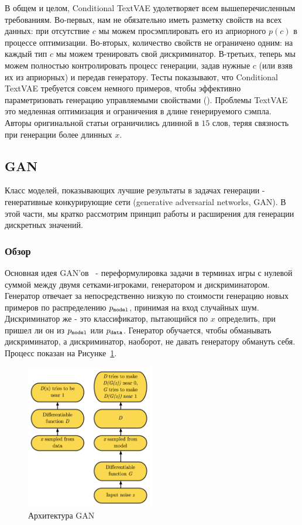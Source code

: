 \documentclass{spbau-diploma}
\begin{document}
В общем и целом, Conditional TextVAE удолетворяет всем вышеперечисленным 
требованиям. Во-первых, нам не обязательно иметь разметку свойств на всех 
данных: при отсутствие $c$ мы можем просэмплировать его из априорного $p(c)$ в
процессе оптимизации. Во-вторых, количество свойств не ограничено одним: на 
каждый тип $c$ мы можем тренировать свой дискриминатор. В-третьих, теперь мы
можем полностью контролировать процесс генерации, задав нужные $c$ (или взяв
их из априорных) и передав генератору. Тесты показывают, что Conditional TextVAE
требуется совсем немного примеров, чтобы эффективно параметризовать генерацию
управляемыми свойствами (\cite{text_cvae}). Проблемы TextVAE это медленная
оптимизация и ограничения в длине генерируемого сэмпла. Авторы оригинальной 
статьи ограничились длинной в $15$ слов, теряя связность при генерации более
длинных $x$.

\subsection{GAN}
Класс моделей, показывающих лучшие результаты в задачах генерации - генеративные
конкурирующие сети (generative adversarial networks, GAN). В этой части, мы 
кратко рассмотрим принцип работы и расширения для генерации дискретных значений.

\subsubsection{Обзор}
Основная идея GAN'ов~\cite{1406.2661} - переформулировка задачи в терминах 
игры с нулевой суммой между двумя сетками-игроками, генератором и 
дискриминатором. Генератор отвечает за непосредственно низкую по стоимости 
генерацию новых примеров по распределению $p_{\texttt{model}}$, принимая на вход случайных 
шум. Дискриминатор же - это классификатор, пытающийся по $x$ определить, при 
пришел ли он из $p_{\texttt{model}}$ или $p_{\texttt{data}}$. Генератор обучается, чтобы обманывать 
дискриминатор, а дискриминатор, наоборот, не давать генератору обмануть себя. 
Процесс показан на Рисунке~\ref{gan_fw}.

\begin{figure}[h]
\centering
\includegraphics[width=0.5\textwidth]{images/gan_fw.png}
\caption{Архитектура GAN}
\label{gan_fw}
\end{figure}
\end{document}
